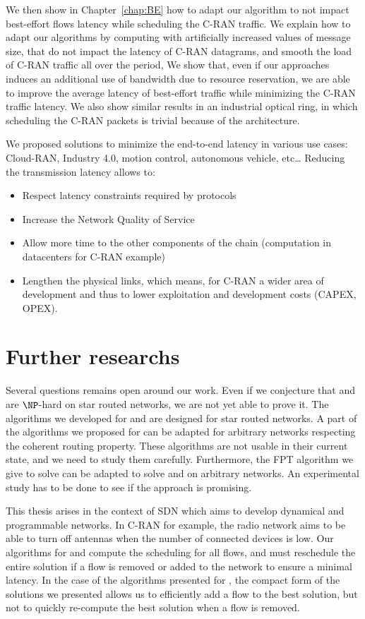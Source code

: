 We then show in Chapter~\ref{chap:BE} how to adapt our algorithm to not impact best-effort flows latency while scheduling the C-RAN traffic. We explain how to adapt our algorithms by computing with artificially increased values of message size, that do not impact the latency of C-RAN datagrams, and smooth the load of C-RAN traffic all over the period, 
 We show that, even if our approaches induces an additional use of bandwidth due to resource reservation, we are able to improve the average latency of best-effort traffic while minimizing the C-RAN traffic latency. We also show similar results in an industrial optical ring, in which scheduling the C-RAN packets is trivial because of the architecture.

We proposed solutions to minimize the end-to-end latency in various use cases: Cloud-RAN, Industry 4.0, motion control, autonomous vehicle, etc\ldots
Reducing the transmission latency allows to:
\begin{itemize}
	\item Respect latency constraints required by protocols
	\item Increase the Network Quality of Service 
	\item Allow more time to the other components of the chain (computation in datacenters for C-RAN example) 
	\item Lengthen the physical links, which means, for C-RAN a wider area of development and thus to lower exploitation and development costs (CAPEX, OPEX).
\end{itemize} 

\section*{Further researchs}

Several questions remains open around our work. Even if we conjecture that \pazl and \pall are $\NP$-hard on star routed networks, we are not yet able to prove it. 
The algorithms we developed for \pazl and \pall are designed for star routed networks. A part of the algorithms we proposed for \pazl can be adapted for arbitrary networks respecting the coherent routing property. These algorithms are not usable in their current state, and we need to study them carefully. Furthermore, the FPT algorithm we give to solve \minstra can be adapted to solve \pazl and \pall on arbitrary networks. An experimental study has to be done to see if the approach is promising.

This thesis arises in the context of SDN which aims to develop dynamical and programmable networks. In C-RAN for example, the radio network aims to be able to turn off antennas when the number of connected devices is low. Our algorithms for \pazl and \pall compute the scheduling for all flows, and must reschedule the entire solution if a flow is removed or added to the network to ensure a minimal latency. In the case of the algorithms presented for \minstra, the compact form of the solutions we presented allows us to efficiently add a flow to the best solution, but not to quickly re-compute the best solution when a flow is removed.

